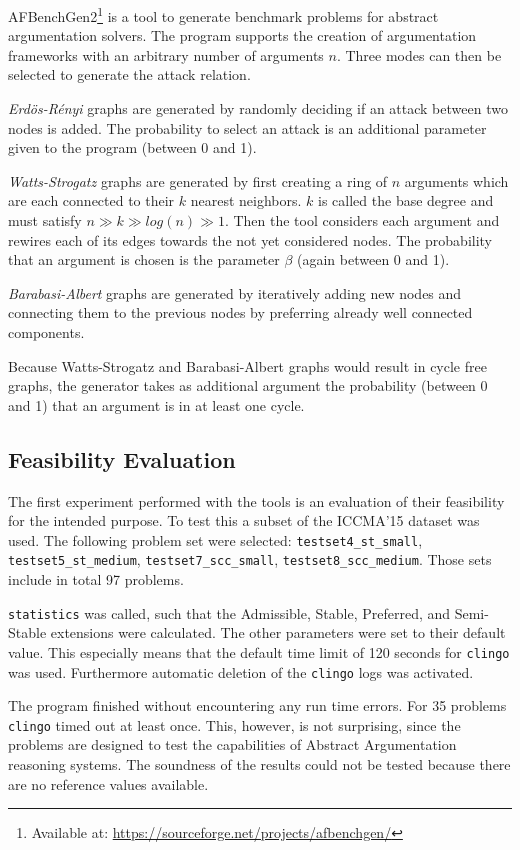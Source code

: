 \documentclass[parskip=half]{scrartcl}
\begin{document}
AFBenchGen2\footnote{Available at:
\url{https://sourceforge.net/projects/afbenchgen/}} is a tool to generate
benchmark problems for abstract argumentation solvers\cite{afbenchgen2}. The
program supports the creation of argumentation frameworks with an arbitrary
number of arguments $n$. Three modes can then be selected to generate the
attack relation.

\emph{Erdös-Rényi} graphs are generated by randomly deciding if an attack
between two nodes is added. The probability to select an attack is an additional
parameter given to the program (between 0 and 1).

\emph{Watts-Strogatz} graphs are generated by first creating a ring of $n$
arguments which are each connected to their $k$ nearest neighbors. $k$ is called
the base degree and must satisfy $n \gg k \gg log(n) \gg 1$. Then the tool
considers each argument and rewires each of its edges towards the not yet
considered nodes. The probability that an argument is chosen is the parameter
$\beta$ (again between 0 and 1).

\emph{Barabasi-Albert} graphs are generated by iteratively adding new nodes and
connecting them to the previous nodes by preferring already well connected
components.

Because Watts-Strogatz and Barabasi-Albert graphs would result in cycle free
graphs, the generator takes as additional argument the probability (between 0
and 1) that an argument is in at least one cycle.

\subsection{Feasibility Evaluation}
The first experiment performed with the tools is an evaluation of their
feasibility for the intended purpose. To test this a subset of the
ICCMA'15 dataset was used. The following problem set were selected:
\texttt{testset4\_st\_small}, \texttt{testset5\_st\_medium},
\texttt{testset7\_scc\_small}, \texttt{testset8\_scc\_medium}.
Those sets include in total 97 problems.

\texttt{statistics} was called, such that the Admissible, Stable, Preferred, and
Semi-Stable extensions were calculated. The other parameters were set to their
default value. This especially means that the default time limit of 120 seconds for
\texttt{clingo} was used. Furthermore automatic deletion of the \texttt{clingo}
logs was activated.

The program finished without encountering any run time errors. For 35 problems
\texttt{clingo} timed out at least once. This, however, is not surprising, since
the problems are designed to test the capabilities of Abstract Argumentation
reasoning systems. The soundness of the results could not be tested because there
are no reference values available.
\end{document}
